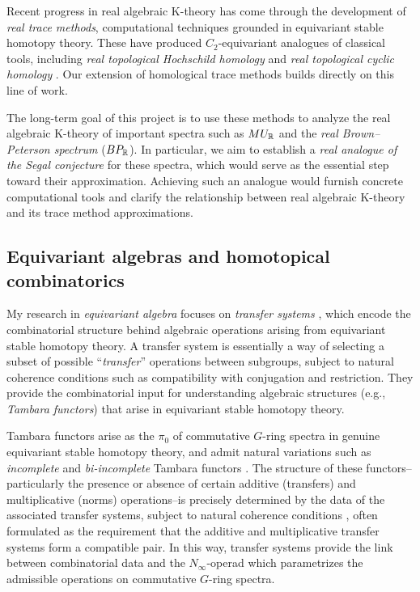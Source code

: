 \documentclass[11pt]{article}
\begin{document}
Recent progress in real algebraic K-theory has come through the development of {\it real trace methods}, computational techniques grounded in equivariant stable homotopy theory.
These have produced $C_2$-equivariant analogues of classical tools, including {\it real topological Hochschild homology} \cite{Dotto} and {\it real topological cyclic homology} \cite{Hogenhaven}.
Our extension of homological trace methods builds directly on this line of work.

The long-term goal of this project is to use these methods to analyze the real algebraic K-theory of important spectra such as $MU_{\mathbb{R}}$ and the {\it real Brown–Peterson spectrum} ($BP_{\mathbb{R}}$).
In particular, we aim to establish a {\it real analogue of the Segal conjecture} for these spectra, which would serve as the essential step toward their approximation.
Achieving such an analogue would furnish concrete computational tools and clarify the relationship between real algebraic K-theory and its trace method approximations.


\subsection{Equivariant algebras and homotopical combinatorics}
My research in {\it equivariant algebra} focuses on {\it transfer systems} \cite{MR4244201}, which encode the combinatorial structure behind algebraic operations arising from equivariant stable homotopy theory.
A transfer system is essentially a way of selecting a subset of possible ``{\it transfer}'' operations between subgroups, subject to natural coherence conditions such as compatibility with conjugation and restriction.
They provide the combinatorial input for understanding algebraic structures (e.g., {\it Tambara functors}) that arise in equivariant stable homotopy theory.

Tambara functors \cite{MR1209937} arise as the $\pi_0$ of commutative $G$-ring spectra in genuine equivariant stable homotopy theory, and admit natural variations such as {\it incomplete} and {\it bi-incomplete} Tambara functors \cite{MR3773736,MR4327103}.
The structure of these functors--particularly the presence or absence of certain additive (transfers) and multiplicative (norms) operations--is precisely determined by the data of the associated transfer systems, subject to natural coherence conditions \cite{MR4696086}, often formulated as the requirement that the additive and multiplicative transfer systems form a compatible pair.
In this way, transfer systems provide the link between combinatorial data and the $N_\infty$-operad which parametrizes the admissible operations on commutative $G$-ring spectra.
\end{document}

